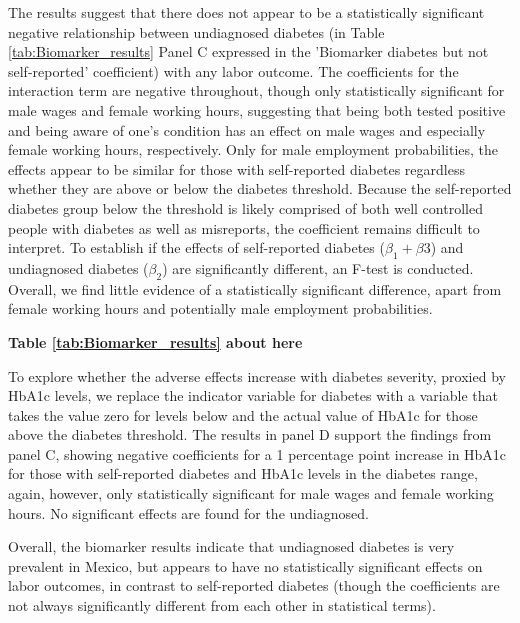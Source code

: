 \documentclass[12pt,english]{article}
\begin{document}
The results suggest that there does not appear to be a statistically significant negative relationship between undiagnosed diabetes (in Table \ref{tab:Biomarker_results} Panel C expressed in the 'Biomarker diabetes but not self-reported' coefficient) with any labor outcome. The coefficients for the interaction term are negative throughout, though only statistically significant for male wages and female working hours, suggesting that being both tested positive and being aware of one's condition has an effect on male wages and especially female working hours, respectively. Only for male employment probabilities, the effects appear to be similar for those
with self-reported diabetes regardless whether they are above or below the diabetes threshold.
Because the self-reported diabetes group below the threshold is likely comprised of both
well controlled people with diabetes as well as misreports, the coefficient remains difficult
to interpret. To establish if the effects of self-reported diabetes ($\beta_{1} + \beta{3}$) and undiagnosed
diabetes ($\beta_{2}$) are significantly different, an F-test is conducted. Overall, we find little
evidence of a statistically significant difference, apart from female working hours and
potentially male employment probabilities.

\begin{center}
	\textbf{Table \ref{tab:Biomarker_results} about here}
\end{center}


To explore whether the adverse effects increase with diabetes severity, proxied by
HbA1c levels, we replace the indicator variable for diabetes with a variable that takes
the value zero for levels below and the actual value of HbA1c for those above the diabetes
threshold. The results in panel D support the findings from panel C, showing negative
coefficients for a 1 percentage point increase in HbA1c for those with self-reported diabetes
and HbA1c levels in the diabetes range, again, however, only statistically significant for
male wages and female working hours. No significant effects are found for the undiagnosed.

Overall, the biomarker results indicate that undiagnosed diabetes is very prevalent in
Mexico, but appears to have no statistically significant effects on labor outcomes, in contrast to self-reported diabetes (though the coefficients are not always significantly different from each other in statistical terms).
\end{document}
